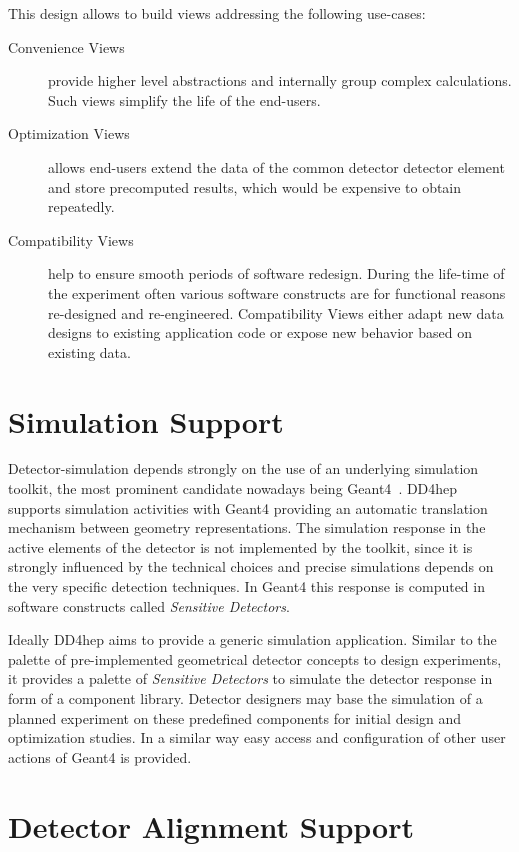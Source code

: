 This design allows to build views addressing the following use-cases:
\begin{description}
\item[Convenience Views] provide higher level abstractions and internally group complex calculations. Such views simplify  the life of the end-users.
\item[Optimization Views] allows end-users extend the data of the common detector detector element and store precomputed results, which would be expensive to obtain repeatedly.
\item[Compatibility Views] help to ensure smooth periods of  software redesign. During the life-time of the experiment often various software constructs are for functional reasons  re-designed and re-engineered. Compatibility Views either adapt new data designs to existing application code or expose new behavior based on existing data.
\end{description}

\section{Simulation Support}
\label{subsect:simulation-support}

Detector-simulation depends strongly on the use of an underlying simulation toolkit,  the most prominent candidate nowadays being Geant4~\cite{Agostinelli:2002hh}. DD4hep supports simulation activities with Geant4 providing an automatic translation mechanism between geometry representations. The simulation response in the active elements of the detector is not implemented by the toolkit, since it is strongly influenced by the technical choices and precise simulations depends on the very specific detection techniques. In Geant4 this response is computed in software constructs called \textit{Sensitive Detectors}.

Ideally DD4hep aims to provide a generic simulation application. Similar to the palette of pre-implemented geometrical detector  concepts to design experiments, it provides a palette of \textit{Sensitive Detectors} to simulate the detector response in form of a component library. Detector designers may base the simulation of a planned experiment  on these predefined components for initial design and optimization studies.  In a similar way easy access and configuration of other user actions of Geant4 is provided.

\section{Detector Alignment Support}
\label{subsect:alignment-support}

